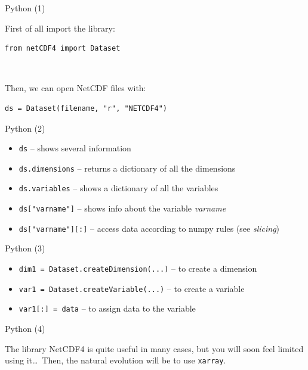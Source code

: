 \documentclass[9pt]{beamer}
\begin{document}
\begin{frame}[fragile]{Python (1)}

First of all import the library:

\begin{verbatim}
from netCDF4 import Dataset
\end{verbatim}

\pause

\ 

Then, we can open NetCDF files with:

\begin{verbatim}
ds = Dataset(filename, "r", "NETCDF4")
\end{verbatim}
\end{frame}


\begin{frame}[fragile]{Python (2)}

\begin{itemize}
    \item \texttt{ds} -- shows several information
    \item \texttt{ds.dimensions} -- returns a dictionary of all the dimensions
    \item \texttt{ds.variables} -- shows a dictionary of all the variables
    \item \texttt{ds["varname"]} -- shows info about the variable \textit{varname}
    \item \texttt{ds["varname"][:]} -- access data according to numpy rules (see \textit{slicing})
\end{itemize}

\end{frame}

\begin{frame}[fragile]{Python (3)}

\begin{itemize}
    \item \texttt{dim1 = Dataset.createDimension(...)} -- to create a dimension
    \item \texttt{var1 = Dataset.createVariable(...)} -- to create a variable
    \item \texttt{var1[:] = data} -- to assign data to the variable
\end{itemize}

\end{frame}


\begin{frame}[fragile]{Python (4)}

The library NetCDF4 is quite useful in many cases, but you will soon feel limited using it\dots\ Then, the natural evolution will be to use \texttt{xarray}.

\end{frame}
\end{document}
